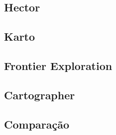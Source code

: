 \subsection{Hector}

\subsection{Karto}

\subsection{Frontier Exploration}

\subsection{Cartographer}

\subsection{Comparação}
